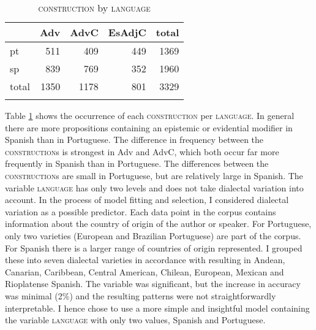 \begin{table}
\begin{tabular}{l *4{r}}
\lsptoprule
	& Adv & AdvC & EsAdjC& total\\ 
\midrule
	pt & 511 & 409 & 449&1369  \\ 
	sp & 839 & 769 & 352 &1960\\ 
\midrule 
	total	&1350 &  1178  &  801&3329\\
\lspbottomrule
	\end{tabular}
\caption{\textsc{construction} by \textsc{language}\label{tab:corpconstlang}}
\end{table}

Table \ref{tab:corpconstlang} shows the occurrence of each \textsc{construction} per \textsc{language}. In general there  are more  propositions containing an epistemic or evidential modifier in Spanish than in Portuguese. The difference in frequency between the \textsc{construction}s is strongest in Adv and AdvC, which both occur far more frequently in Spanish than in Portuguese. The differences  between the \textsc{construction}s are small in Portuguese, but are relatively large in Spanish. The variable \textsc{language} has only two levels and does not take dialectal variation into account. In the process of model fitting and selection, I considered dialectal variation as a possible predictor. Each data point in the corpus contains information about the country of origin of the author or speaker. For Portuguese, only two varieties (European and Brazilian Portuguese) are part of the corpus. For Spanish there is a larger range of countries of origin represented.  I grouped these into  seven dialectal varieties in accordance with \citet{Hualde2009} resulting in   Andean, Canarian, Caribbean, Central American, Chilean,  European, Mexican and Rioplatense Spanish. The variable was significant, but the increase in accuracy was minimal (2\%) and the resulting patterns were not straightforwardly interpretable. I hence chose to use a more simple and insightful model containing  the variable \textsc{language} with  only   two values, Spanish and Portuguese.

